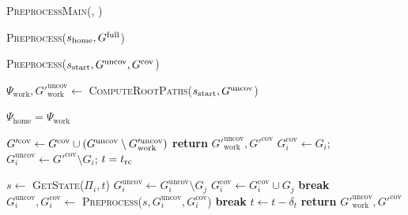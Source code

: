 \documentclass[a4paper,10pt]{article}
\begin{document}
\begin{algorithm}[t]
\caption{\textsc{PreprocessMain(\Shome, \Gfull)}}\label{alg:all}
    \AlgFontSize
\begin{algorithmic}[1]
    \State \textsc{Preprocess}($s_{\textrm{home}}, G^{\textrm{full}}$)
\end{algorithmic}
\end{algorithm}
%
\begin{algorithm}[t]
\caption{\textsc{Preprocess}($s_{\textrm{start}},G^{\textrm{uncov}},G^{\textrm{cov}} $)}\label{alg:preprocess}
    \AlgFontSize
\begin{algorithmic}[1]
\State $\Psi_{\textrm{work}}, G'^{\textrm{uncov}}_{\textrm{work}} \leftarrow$ \textsc{ComputeRootPaths}($s_{\textrm{start}},G^{\textrm{uncov}}$)

\If {$\Sstart = \Shome$}
    \State $\Psi_{\textrm{home}} = \Psi_{\textrm{work}}$
\EndIf

\State $G'^{\textrm{cov}} \leftarrow 
    G^{\textrm{cov}} \cup (G^{\textrm{uncov}} \setminus G'^{\textrm{uncov}}_{\textrm{work}})$
    \State \textbf{return} $G'^{\textrm{uncov}}_{\textrm{work}}, G'^{\textrm{cov}}$
\EndIf
{}
    \State $G_i^{\textrm{cov}} \leftarrow G_i$;
            \hspace{2mm}
           $G_i^{\textrm{uncov}} \leftarrow G'^{\textrm{cov}} \setminus G_i$;
            \hspace{2mm}
           $t = t_{\textrm{rc}}$

        \State $s \leftarrow$ \textsc{GetState($\Pi_i, t$)}
        \label{alg:preprocess:line:latch1a}
                \State $G_i^{\textrm{uncov}} \leftarrow G_i^{\textrm{uncov}} \setminus G_j$
                \State $G_i^{\textrm{cov}} \leftarrow G_i^{\textrm{cov}} \cup G_j$
                \label{alg:preprocess:line:latch1b}
            \EndIf
        \EndFor
            \State \textbf{break}
        \EndIf
        \State $G_i^{\textrm{uncov}},G_i^{\textrm{cov}} \leftarrow$ \textsc{Preprocess}($s,G_i^{\textrm{uncov}},G_i^{\textrm{cov}}$)
            \State \textbf{break}
        \EndIf
        \State $t \leftarrow t - \delta_t$
    \EndWhile
\EndFor
\State \textbf{return} $G'^{\textrm{uncov}}_{\textrm{work}}, G'^{\textrm{cov}}$

\end{algorithmic}
\end{algorithm}
\end{document}
